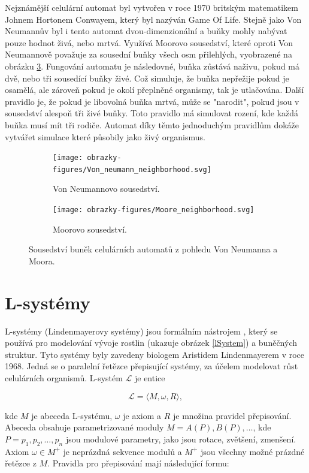 Nejznámější celulární automat byl vytvořen v roce 1970 britským matematikem Johnem Hortonem Conwayem, který byl nazýván Game Of Life. Stejně jako Von Neumannův byl i tento automat dvou-dimenzionální a buňky mohly nabývat pouze hodnot živá, nebo mrtvá. Využívá Moorovo sousedství, které oproti Von Neumannově považuje za sousední buňky všech osm přilehlých, vyobrazené na obrázku \ref{moore}. Fungování automatu je následovné, buňka zůstává naživu, pokud má dvě, nebo tři sousedící buňky živé. Což simuluje, že buňka nepřežije pokud je osamělá, ale zároveň pokud je okolí přeplněné organismy, tak je utlačována. Další pravidlo je, že pokud je libovolná buňka mrtvá, může se "narodit", pokud jsou v sousedství alespoň tři živé buňky. Toto pravidlo má simulovat rození, kde každá buňka musí mít tři rodiče. Automat díky těmto jednoduchým pravidlům dokáže vytvářet simulace které působily jako živý organismus. \cite{Gong2017}

\begin{figure}[h]
	\centering
	\begin{subfigure}{0.475\textwidth}
		\centering
		\texttt{[image: obrazky-figures/Von\_neumann\_neighborhood.svg]}
		\caption{Von Neumannovo sousedství.}
		\label{vonNeumann}
	\end{subfigure}
	\begin{subfigure}{0.475\textwidth}
		\centering
		\texttt{[image: obrazky-figures/Moore\_neighborhood.svg]}
		\caption{Moorovo sousedství.}
		\label{moore}
	\end{subfigure}
	\caption{Sousedství buněk celulárních automatů z pohledu Von Neumanna a Moora.}
\end{figure}

\section{L-systémy}
\label{lsystems}
L-systémy (Lindenmayerovy systémy) jsou formálním nástrojem \cite{prusinkiewicz1986graphical}, který se používá pro modelování vývoje rostlin (ukazuje obrázek \ref{lSystem}) a buněčných struktur. Tyto systémy byly zavedeny biologem Aristidem Lindenmayerem v roce 1968. \cite{inverseL-systems} Jedná se o paralelní řetězce přepisující systémy, za účelem modelovat růst celulárních organismů. L-systém $\mathcal{L}$ je entice

\[\mathcal{L} = \langle M,\omega,R\rangle ,\]


kde $M$ je abeceda L-systému, $\omega$ je axiom a $R$ je množina pravidel přepisování. Abeceda obsahuje parametrizované moduly $M = {A(P),B(P),\ldots}$, kde $P=p_1,p_2,\ldots,p_n$ jsou modulové parametry, jako jsou rotace, zvětšení, zmenšení.
Axiom $\omega \in M^+$ je neprázdná sekvence modulů a $M^+$ jsou všechny možné prázdné řetězce z $M$. Pravidla pro přepisování mají následující formu:


